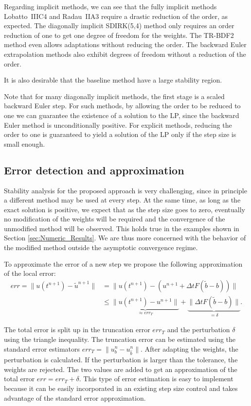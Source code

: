 \documentclass[a4paper]{article}
\numberwithin{equation}{section}
\theoremstyle{plain}
\theoremstyle{definition}
\numberwithin{theorem}{section}
\newcommand{\dt}{{\Delta t}}
\newcommand{\1}{\mathbbm{1}}
\newcommand{\bt}{\tilde{b}}
\begin{document}
Regarding implicit methods,
we can see that the fully implicit methods Lobatto~IIIC4 and Radau~IIA3 require a drastic reduction of the order, as expected.
The diagonally implicit SDIRK(5,4) method only requires an order reduction of one to get one degree of freedom for the weights.
The TR-BDF2 method even allows adaptations without reducing the order.
The backward Euler extrapolation methods also exhibit degrees of freedom without a reduction of the order.

It is also desirable that the baseline method have a large stability region.

Note that for many diagonally implicit methods, the first stage is a scaled backward Euler step.
For such methods, by allowing the order to be reduced to one
we can guarantee the existence of a solution to the LP, since the backward Euler method
is unconditionally positive.  For explicit methods, reducing the order to one is guaranteed
to yield a solution of the LP only if the step size is small enough.

\subsection{Error detection and approximation}\label{sec:error}
Stability analysis for the proposed approach is very challenging, since in principle
a different method may be used at every step.  At the same time, as long as the exact
solution is positive, we expect that as the step size goes to zero, eventually no modification
of the weights will be required and the convergence of the unmodified method will be observed.
This holds true in the examples shown in Section \ref{sec:Numeric_Results}.  We are thus more concerned with
the behavior of the modified method outside the asymptotic convergence regime.

To approximate the error of a new step we propose the following approximation of the local error:
\begin{align}
err = \|u(t^{n+1})-\tilde u^{n+1}\| &= \|u(t^{n+1}) - (u^{n+1}+\dt F(\bt-b))\| \\
 &\leq \underbrace{\|u(t^{n+1})-u^{n+1}\|}_{\approx err_T}+\underbrace{\|\dt F(\bt-b)\|}_{= \delta}. \label{eq:Err}
\end{align}

The total error is split up in the truncation error $err_T$ and the perturbation $\delta$ using the triangle inequality.
The truncation error can be estimated using the standard error estimators $err_T = \| u^{n}_{b} - u^{n}_{\hat{b}} \|$.
After adapting the weights, the perturbation is calculated. If the perturbation is larger than the tolerance, the weights are rejected.
The two values are added to get an approximation of the total error $err = err_T + \delta$.
This type of error estimation is easy to implement because it can be easily
incorporated in an existing step size control and takes advantage of the
standard error approximation.
\end{document}
